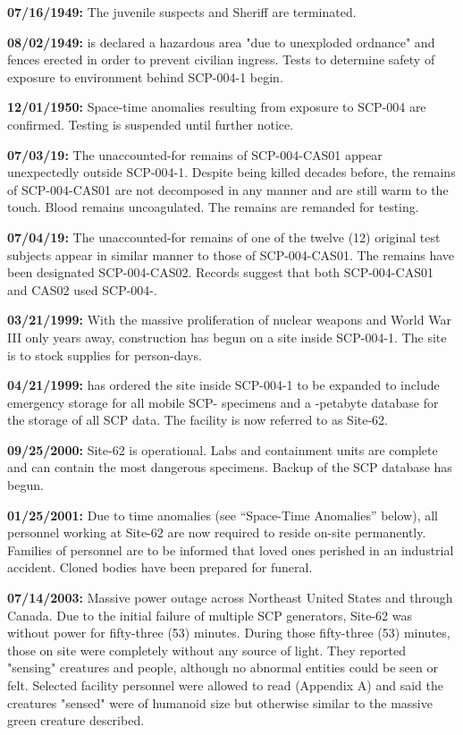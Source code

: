 \textbf{07/16/1949:} The juvenile suspects and Sheriff   are terminated.

\textbf{08/02/1949:}  is declared a hazardous area "due to unexploded ordnance" and fences erected in order to prevent civilian ingress. Tests to determine safety of exposure to environment behind SCP-004-1 begin.

\textbf{12/01/1950:} Space-time anomalies resulting from exposure to SCP-004 are confirmed. Testing is suspended until further notice.

\textbf{07/03/19:} The unaccounted-for remains of SCP-004-CAS01 appear unexpectedly outside SCP-004-1. Despite being killed decades before, the remains of SCP-004-CAS01 are not decomposed in any manner and are still warm to the touch. Blood remains uncoagulated. The remains are remanded for testing.

\textbf{07/04/19:} The unaccounted-for remains of one of the twelve (12) original test subjects appear in similar manner to those of SCP-004-CAS01. The remains have been designated SCP-004-CAS02. Records suggest that both SCP-004-CAS01 and CAS02 used SCP-004-.

\textbf{03/21/1999:} With the massive proliferation of nuclear weapons and World War III only  years away, construction has begun on a site inside SCP-004-1. The site is to stock supplies for  person-days.

\textbf{04/21/1999:}  has ordered the site inside SCP-004-1 to be expanded to include emergency storage for all mobile SCP- specimens and a -petabyte database for the storage of all SCP data. The facility is now referred to as Site-62.

\textbf{09/25/2000:} Site-62 is operational. Labs and containment units are complete and can contain the most dangerous specimens. Backup of the SCP database has begun.

\textbf{01/25/2001:} Due to time anomalies (see “Space-Time Anomalies” below), all personnel working at Site-62 are now required to reside on-site permanently. Families of personnel are to be informed that loved ones perished in an industrial accident. Cloned bodies have been prepared for funeral.

\textbf{07/14/2003:} Massive power outage across Northeast United States and through Canada. Due to the initial failure of multiple SCP generators, Site-62 was without power for fifty-three (53) minutes. During those fifty-three (53) minutes, those on site were completely without any source of light. They reported "sensing" creatures and people, although no abnormal entities could be seen or felt. Selected facility personnel were allowed to read  (Appendix A) and said the creatures "sensed" were of humanoid size but otherwise similar to the massive green creature described.


